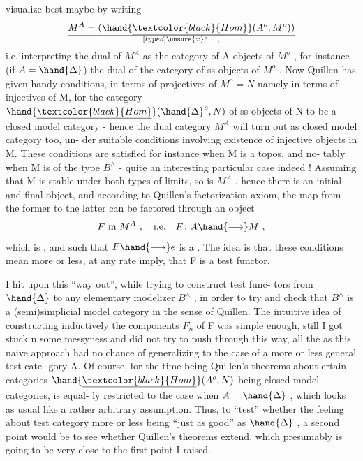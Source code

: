 
visualize best maybe by writing
\[ M^{A} = (\hand{\underline{\textcolor{black}{Hom}}}(A^{o},M^{o}))\over[typed]{\unsure{x}}{{}^{o}} \quad , \]
i.e. interpreting the dual of $M^{A}$ as the category of A-objects of $M^{o}$ ,
for instance (if $A = \hand{\Delta}$)  the  dual of the category of ss objects of
$M^{o}$ . Now Quillen has given handy conditions, in terms of projectives
of $M^{o} = N$ namely in terms of injectives of M, for the category
$\hand{\underline{\textcolor{black}{Hom}}}(\hand{\Delta}^{o},N)$ of ss objects of N to be a closed model category - hence
the dual category $M^{A}$ will turn out as  closed model category too, un-%
der suitable conditions involving existence of injective objects in M.
These conditions are satisfied for instance when M is a topos, and no-%
tably when M is of the type $B^{\wedge}$ - quite an interesting particular case
indeed ! Assuming that M is stable under both types of limits, so is
$M^{A}$ , hence there is an initial and final object, and according to
Quillen's factorization axiom, the  map from the former to
the latter can be factored through an object
\[ F \text{ in } M^{A} \ , \quad \text{i.e.} \quad F \colon A \hand{\longrightarrow} M \ , \]
which is \hand{\uline{\textcolor{black}{cofibering}}}, and such that $F \hand{\longrightarrow} e$ is a \hand{\uline{\textcolor{black}{trivial fibration}}}.
The idea is that these conditions mean more or less, at any rate imply,
that F is a test functor.

I hit upon this ``way out'', while trying to construct test func-%
tors from $\hand{\Delta}$ to any elementary modelizer $B^{\wedge}$ , in order to try and check
that $B^{\wedge}$ is a (semi)simplicial model category in the sense of Quillen.
The intuitive idea of constructing inductively the components $F_{n}$ of F
was simple enough, still I got stuck n some messyness and did not try
to push through this way, all the  as this naive approach had no
chance of generalizing to the case of a more or less general test cate-%
gory A. Of course, for the time being Quillen's theorems\hand{,} about
crtain categories $\hand{\underline{\textcolor{black}{Hom}}}(A^{o},N)$ being closed model categories, is equal-%
ly restricted to the case when $A = \hand{\Delta}$ , which looks as usual like a
rather arbitrary assumption. Thus, to ``test'' whether the feeling 
about \hand{\uline{\textcolor{black}{any}}} test category more or less being ``just as good'' as $\hand{\Delta}$ , a
second point would be to see whether Quillen's theorems extend, which
presumably is going to be very close to the first point I raised.

